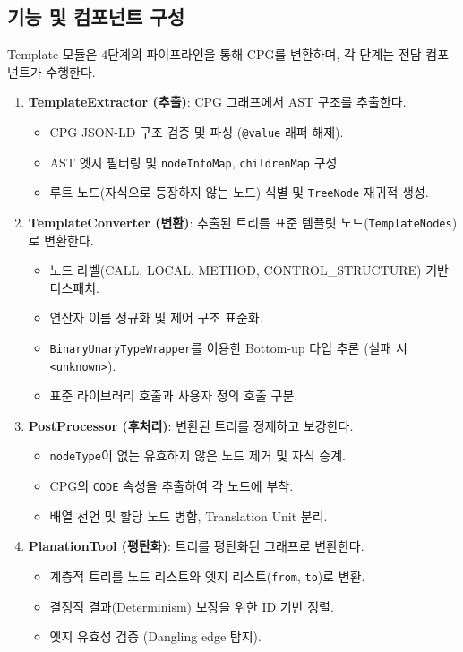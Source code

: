 \subsection{기능 및 컴포넌트 구성}
Template 모듈은 4단계의 파이프라인을 통해 CPG를 변환하며, 각 단계는 전담 컴포넌트가 수행한다.

\begin{enumerate}
    \item \textbf{TemplateExtractor (추출)}: CPG 그래프에서 AST 구조를 추출한다.
    \begin{itemize}
        \item CPG JSON-LD 구조 검증 및 파싱 (\texttt{@value} 래퍼 해제).
        \item AST 엣지 필터링 및 \texttt{nodeInfoMap}, \texttt{childrenMap} 구성.
        \item 루트 노드(자식으로 등장하지 않는 노드) 식별 및 \texttt{TreeNode} 재귀적 생성.
    \end{itemize}
    
    \item \textbf{TemplateConverter (변환)}: 추출된 트리를 표준 템플릿 노드(\texttt{TemplateNodes})로 변환한다.
    \begin{itemize}
        \item 노드 라벨(CALL, LOCAL, METHOD, CONTROL\_STRUCTURE) 기반 디스패치.
        \item 연산자 이름 정규화 및 제어 구조 표준화.
        \item \texttt{BinaryUnaryTypeWrapper}를 이용한 Bottom-up 타입 추론 (실패 시 \texttt{<unknown>}).
        \item 표준 라이브러리 호출과 사용자 정의 호출 구분.
    \end{itemize}
    
    \item \textbf{PostProcessor (후처리)}: 변환된 트리를 정제하고 보강한다.
    \begin{itemize}
        \item \texttt{nodeType}이 없는 유효하지 않은 노드 제거 및 자식 승계.
        \item CPG의 \texttt{CODE} 속성을 추출하여 각 노드에 부착.
        \item 배열 선언 및 할당 노드 병합, Translation Unit 분리.
    \end{itemize}
    
    \item \textbf{PlanationTool (평탄화)}: 트리를 평탄화된 그래프로 변환한다.
    \begin{itemize}
        \item 계층적 트리를 노드 리스트와 엣지 리스트(\texttt{from}, \texttt{to})로 변환.
        \item 결정적 결과(Determinism) 보장을 위한 ID 기반 정렬.
        \item 엣지 유효성 검증 (Dangling edge 탐지).
    \end{itemize}
\end{enumerate}

